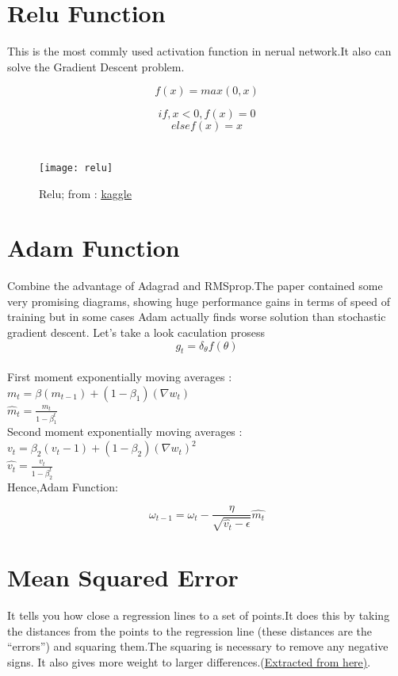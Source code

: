\documentclass[12pt,a4paper]{article}
\begin{document}
\section{Relu Function}
This is the most commly used activation function in nerual network.It also can solve the Gradient Descent problem.
\begin{Large}$$f(x)=max(0,x)$$\end{Large}
$$if , x<0 , f(x)=0$$
$$else f(x)=x$$\\

\begin{figure}[hbt!]
\begin{center}
\texttt{[image: relu]}\\
\caption{Relu; from : \href{https://www.kaggle.com/dansbecker/rectified-linear-units-relu-in-deep-learning}{\underline{kaggle}} 
}
\end{center} 
\end{figure}

\section{Adam Function}
Combine the advantage of Adagrad and RMSprop.The paper contained some very promising diagrams, showing huge performance gains in terms of speed of training but in some cases Adam actually finds worse solution than stochastic gradient descent. Let's take a look caculation prosess \\[6pt]
$$g_t=\delta_{\theta}f(\theta)$$\\
First moment exponentially moving averages : $m_t =\beta(m_{t-1})+(1-\beta_1)(\nabla{w_t})$\\[6pt]
$\hat m_t=\frac{m_t}{1-\beta_1^t}$\\[6pt]
Second moment exponentially moving averages :$v_t=\beta_2(v_t-1)+(1-\beta_2)(\nabla{w_t})^2$\\[6pt]
$\hat{v_t}=\frac{v_t}{1-\beta_2^t}$\\[6pt]
Hence,Adam Function:\\[6pt]
\begin{Large}$$\omega_{t-1}=\omega_t-\frac{\eta}{\sqrt{\hat{v_t}-\epsilon}}\hat{m_t}$$\end{Large}
\section{Mean Squared Error}
It tells you how close a regression lines to a set of points.It does this by taking the distances from the points to the regression line (these distances are the “errors”) and squaring them.The squaring is necessary to remove any negative signs. It also gives more weight to larger differences.(\href{https://www.statisticshowto.com/mean-squared-error/}{\underline{Extracted from here)}}.\\[6pt]
\end{document}
